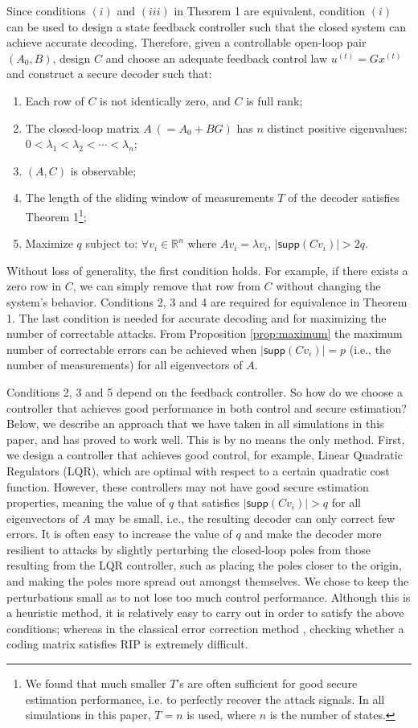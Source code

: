 \documentclass[journal]{IEEEtran}
\begin{document}
Since conditions $(i)$ and $(iii)$ in Theorem 1 are equivalent, condition $(i)$ can be used to design a state feedback controller such that the closed system can achieve accurate decoding. Therefore, given a controllable open-loop pair $(A_0,B)$, design $C$ and choose an adequate feedback control law $u^{(t)} = G x^{(t)}$ and construct a secure decoder such that:
\begin{enumerate}
	\item Each row of $C$ is not identically zero, and $C$ is full rank;
	\item The closed-loop matrix $A~(=A_0+BG)$ has $n$ distinct positive eigenvalues: $0< \lambda_1 < \lambda_2 < \cdots < \lambda _n$;
	\item $(A,C)$ is observable;
	\item The length of the sliding window of measurements $T$ of the decoder satisfies Theorem 1\footnote{We found that much smaller $T$'s are often sufficient for good secure estimation performance, i.e. to perfectly recover the attack signals. In all simulations in this paper, $T=n$ is used, where $n$ is the number of states.};
	\item Maximize $q$ subject to: $\forall v_i \in \mathbb{R}^n$ where $Av_i = \lambda v_i$, $\lvert \textsf{supp} (C v_i)  \rvert > 2q$.
\end{enumerate}
Without loss of generality, the first condition holds. For example, if there exists a zero row in $C$, we can simply remove that row from $C$ without changing the system's behavior. Conditions 2, 3 and 4 are required for equivalence in Theorem 1. The last condition is needed for accurate decoding and for maximizing the number of correctable attacks. From Proposition \ref{prop:maximum} the maximum number of correctable errors can be achieved when $\lvert \textsf{supp} (C v_i)  \rvert = p$ (i.e., the number of measurements) for all eigenvectors of $A$. 

Conditions 2, 3 and 5 depend on the feedback controller. So how do we choose a controller that achieves good performance in both control and secure estimation? Below, we describe an approach that we have taken in all simulations in this paper, and has proved to work well. This is by no means the only method. First, we design a controller that achieves good control, for example, Linear Quadratic Regulators (LQR), which are optimal with respect to a certain quadratic cost function. However, these controllers may not have good secure estimation properties, meaning the value of $q$ that satisfies $\lvert \textsf{supp} (C v_i) \rvert > q$ for all eigenvectors of $A$ may be small, i.e., the resulting decoder can only correct few errors. It is often easy to increase the value of $q$ and make the decoder more resilient to attacks by slightly perturbing the closed-loop poles from those resulting from the LQR controller, such as placing the poles closer to the origin, and making the poles more spread out amongst themselves. We chose to keep the perturbations small as to not lose too much control performance.  
Although this is a heuristic method, it is relatively easy to carry out in order to satisfy the above conditions; whereas in the classical error correction method \cite{Candes_Tao}, checking whether a coding matrix satisfies RIP is extremely difficult.
\end{document}
